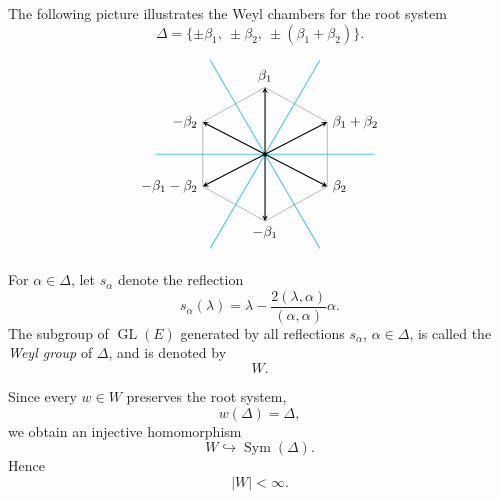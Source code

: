 \begin{example}
    The following picture illustrates the Weyl chambers for the root system
    \[
        \Delta=
        \{\pm\beta_1,\ \pm\beta_2,\ \pm(\beta_1+\beta_2)\}.
    \]

    \[
        \begin{tikzpicture}[scale=1.25, >=stealth]

            \draw[cyan!70, thick] (-2.2,0) -- (2.2,0);
            \draw[cyan!70, thick] (-1.1,-1.9) -- (1.1,1.9);
            \draw[cyan!70, thick] (-1.1,1.9) -- (1.1,-1.9);

            \draw[->, thick] (0,0) -- (0,1.35) node[above] {\(\beta_1\)};
            \draw[->, thick] (0,0) -- (1.25,0.65) node[right] {\(\beta_1+\beta_2\)};
            \draw[->, thick] (0,0) -- (1.25,-0.65) node[right] {\(\beta_2\)};

            \draw[->, thick] (0,0) -- (0,-1.35) node[below] {\(-\beta_1\)};
            \draw[->, thick] (0,0) -- (-1.25,-0.65) node[left] {\(-\beta_1-\beta_2\)};
            \draw[->, thick] (0,0) -- (-1.25,0.65) node[left] {\(-\beta_2\)};

            \draw[gray, thin]
            (0,1.35) -- (1.25,0.65) -- (1.25,-0.65) --
            (0,-1.35) -- (-1.25,-0.65) -- (-1.25,0.65) -- cycle;

            \fill (0,0) circle (1.2pt);

        \end{tikzpicture}
    \]
\end{example}

\begin{definition}
    For \(\alpha\in\Delta\), let \(s_\alpha\) denote the reflection
    \[
        s_\alpha(\lambda)
        =
        \lambda
        -
        \frac{2(\lambda,\alpha)}{(\alpha,\alpha)}\alpha .
    \]
    The subgroup of \(\operatorname{GL}(E)\) generated by all reflections
    \(s_\alpha\), \(\alpha\in\Delta\), is called the \emph{Weyl group} of
    \(\Delta\), and is denoted by
    \[
        W.
    \]
\end{definition}

Since every \(w\in W\) preserves the root system,
\[
    w(\Delta)=\Delta ,
\]
we obtain an injective homomorphism
\[
    W\hookrightarrow \operatorname{Sym}(\Delta).
\]
Hence
\[
    |W|<\infty .
\]

